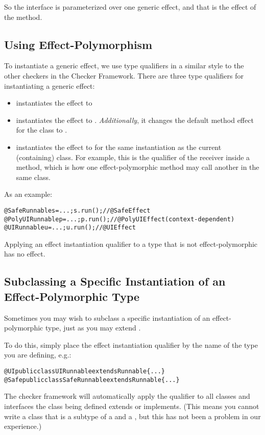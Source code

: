 So the  interface is parameterized over one generic effect, and that is the effect of
the  method.

\subsection{Using Effect-Polymorphism}
To instantiate a generic effect, we use type qualifiers in a similar style to the other checkers in the Checker Framework.
There are three type qualifiers for instantiating a generic effect:
\begin{itemize}
\item {} instantiates the effect to 
\item {} instantiates the effect to .  \emph{Additionally}, it changes the
default method effect for the class to .
\item {} instantiates the effect to  for the same instantiation as
the current (containing) class.  For example, this is the qualifier of the receiver 
inside a  method, which is how one effect-polymorphic method may call another in
the same class.
\end{itemize}

As an example:

\begin{alltt}
@Safe Runnable s = ...;   s.run(); // @SafeEffect
@PolyUI Runnable p = ...; p.run(); // @PolyUIEffect (context-dependent)
@UI Runnable u = ...;     u.run(); // @UIEffect
\end{alltt}

Applying an effect instantiation qualifier to a type that is not effect-polymorphic has no effect.

\subsection{Subclassing a Specific Instantiation of an Effect-Polymorphic Type}
Sometimes you may wish to subclass a specific instantiation of an effect-polymorphic type, just as
you may extend .

To do this, simply place the effect instantiation qualifier by the name of the type you are
defining, e.g.:

\begin{alltt}
@UI public class UIRunnable extends Runnable \{...\}
@Safe public class SafeRunnable extends Runnable \{...\}
\end{alltt}
The checker framework will automatically apply the qualifier to all classes and interfaces the class
being defined extends or implements.  (This means you cannot write a class that is a subtype of a
 and a , but this has not been a problem in our experience.)

